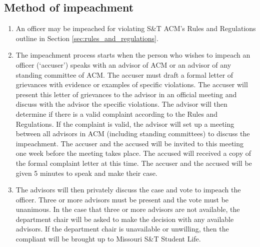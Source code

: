 \subsection{Method of impeachment}\label{sec:officers:impeachment}
\begin{enumerate}
  \item An officer may be impeached for violating S\&T ACM's Rules and
    Regulations outline in Section \ref{sec:rules_and_regulations}.
  \item The impeachment process starts when the person who wishes to impeach
    an officer (`accuser') speaks with an advisor of ACM or an advisor of
    any standing committee of ACM. The accuser must draft a formal letter of
    grievances with evidence or examples of specific violations. The accuser will
    present this letter of grievances to the advisor in an official meeting
    and discuss with the advisor the specific violations. The advisor will
    then determine if there is a valid complaint according to the Rules and
    Regulations. If the complaint is valid, the advisor will set up a
    meeting between all advisors in ACM (including standing committees) to
    discuss the impeachment. The accuser and the accused will be invited to
    this meeting one week before the meeting takes place. The accused will
    received a copy of the formal complaint letter at this time. The accuser and
    the accused will be given 5 minutes to speak and make their case.
  \item The advisors will then privately discuss the case and vote to impeach
    the officer. Three or more advisors must be present and the vote must be
    unanimous. In the case that three or more advisors are not available, the
    department chair will be asked to make the decision with any available
    advisors. If the department chair is unavailable or unwilling, then the
    compliant will be brought up to Missouri S\&T Student Life.
\end{enumerate}
